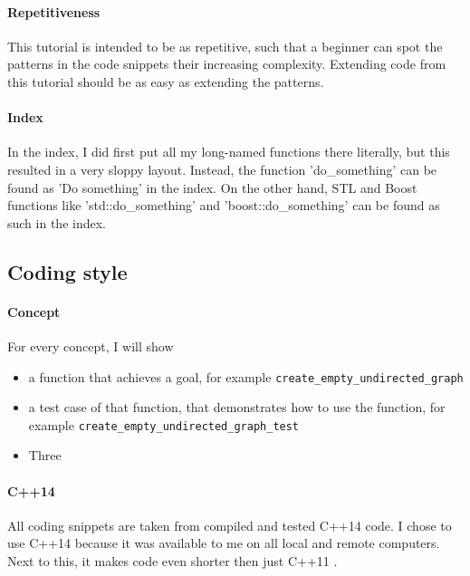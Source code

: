 \paragraph{Repetitiveness}

This tutorial is intended to be as repetitive, such that a beginner can
 spot the patterns in the code snippets their increasing complexity.
 Extending code from this tutorial should be as easy as extending the patterns.

\paragraph{Index}

In the index, I did first put all my long-named functions there literally,
but this resulted in a very sloppy layout.
Instead, the function 'do\_something' can be found as 'Do something' in
the index.
On the other hand, STL and Boost functions like 'std::do\_something' and
'boost::do\_something' can be found as such in the index.

\subsection{Coding style}

\paragraph{Concept}

For every concept, I will show

\begin{itemize}
    \item a function that achieves a goal, 
      for example \verb;create_empty_undirected_graph;
    \item{
      a test case of that function, 
      that demonstrates how to use the function, for example
      \verb;create_empty_undirected_graph_test;
    }
    \item Three
\end{itemize}

\paragraph{C++14}

All coding snippets are taken from compiled and tested C++14 code.
I chose to use C++14 because it was available to me on all local and remote
computers.
Next to this, it makes code even shorter then just C++11 .

